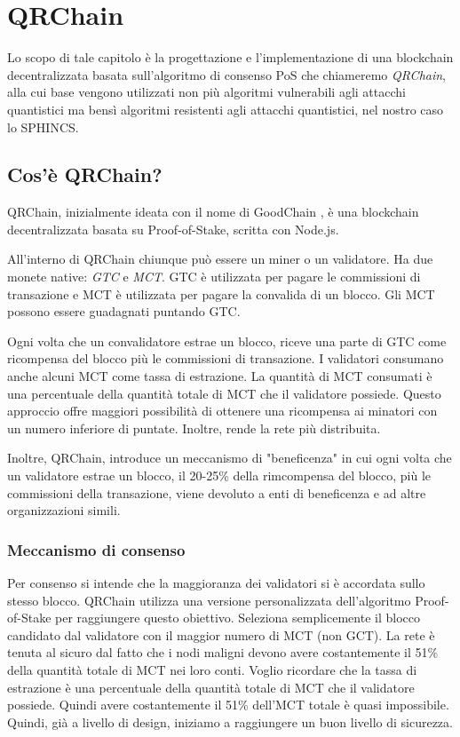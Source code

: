 \chapter{QRChain}
Lo scopo di tale capitolo è la progettazione e l'implementazione di una blockchain decentralizzata basata sull'algoritmo di consenso PoS che chiameremo \textit{QRChain}, alla cui base vengono utilizzati non più algoritmi vulnerabili agli attacchi quantistici ma bensì algoritmi resistenti agli attacchi quantistici, nel nostro caso lo SPHINCS.

\section{Cos'è QRChain?}
QRChain, inizialmente ideata con il nome di GoodChain \cite{Ghorbanzadeh_GoodChain_2022}, è una blockchain decentralizzata basata su Proof-of-Stake, scritta con Node.js.

All'interno di QRChain chiunque può essere un miner o un validatore. Ha due monete native: \textit{GTC} e \textit{MCT}. GTC è utilizzata per pagare le commissioni di transazione e MCT è utilizzata per pagare la convalida di un blocco. Gli MCT possono essere guadagnati puntando GTC.

Ogni volta che un convalidatore estrae un blocco, riceve una parte di GTC come ricompensa del blocco più le commissioni di transazione.
I validatori consumano anche alcuni MCT come tassa di estrazione. La quantità di MCT consumati è una percentuale della quantità totale di MCT che il validatore possiede.
Questo approccio offre maggiori possibilità di ottenere una ricompensa ai minatori con un numero inferiore di puntate. Inoltre, rende la rete più distribuita.

Inoltre, QRChain, introduce un meccanismo di "beneficenza" in cui ogni volta che un validatore estrae un blocco, il 20-25\% della rimcompensa del blocco, più le commissioni della transazione, viene devoluto a enti di beneficenza e ad altre organizzazioni simili.

\subsection{Meccanismo di consenso}
Per consenso si intende che la maggioranza dei validatori si è accordata sullo stesso blocco.
QRChain utilizza una versione personalizzata dell'algoritmo Proof-of-Stake per raggiungere questo obiettivo. Seleziona semplicemente il blocco candidato dal validatore con il maggior numero di MCT (non GCT).
La rete è tenuta al sicuro dal fatto che i nodi maligni devono avere costantemente il 51\% della quantità totale di MCT nei loro conti. Voglio ricordare che la tassa di estrazione è una percentuale della quantità totale di MCT che il validatore possiede. Quindi avere costantemente il 51\% dell'MCT totale è quasi impossibile. Quindi, già a livello di design, iniziamo a raggiungere un buon livello di sicurezza.

